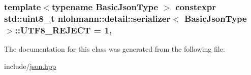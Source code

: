 \subsubsection[{\texorpdfstring{U\+T\+F8\+\_\+\+R\+E\+J\+E\+CT}{UTF8_REJECT}}]{\setlength{\rightskip}{0pt plus 5cm}template$<$typename Basic\+Json\+Type $>$ constexpr std\+::uint8\+\_\+t {\bf nlohmann\+::detail\+::serializer}$<$ Basic\+Json\+Type $>$\+::U\+T\+F8\+\_\+\+R\+E\+J\+E\+CT = 1\hspace{0.3cm}{\ttfamily [static]}, {\ttfamily [private]}}\hypertarget{classnlohmann_1_1detail_1_1serializer_a833bd5805e4380549f4e21c304820d6d}{}\label{classnlohmann_1_1detail_1_1serializer_a833bd5805e4380549f4e21c304820d6d}


The documentation for this class was generated from the following file\+:\begin{DoxyCompactItemize}
\item 
include/\hyperlink{json_8hpp}{json.\+hpp}\end{DoxyCompactItemize}
